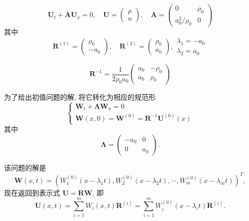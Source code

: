 \documentclass[12pt]{article}
\begin{document}
\begin{equation}
	\boldsymbol{U}_{t}+\boldsymbol{A} \boldsymbol{U}_{x}=0, \quad \boldsymbol{U}=\left(\begin{array}{l}
		\rho \\
		u
		\end{array}\right), \quad \boldsymbol{A}=\left(\begin{array}{cc}
		0 & \rho_{0} \\
		a_{0}^{2} / \rho_{0} & 0
		\end{array}\right)
\end{equation}
其中
\begin{equation}
	\boldsymbol{R}^{(1)}=\left(\begin{array}{c}
		\rho_{0} \\
		-a_{0}
		\end{array}\right), \quad \boldsymbol{R}^{(2)}=\left(\begin{array}{c}
		\rho_{0} \\
		a_{0}
		\end{array}\right), \begin{array}{l}
		\lambda_{1}=-a_{0} \\
		\lambda_{2}=a_{0}
		\end{array}
\end{equation}

\begin{equation}
	\bm{R}^{-1} = \frac{1}{2\rho_0 a_0} \begin{pmatrix}
		a_0&-\rho_0\\
		a_0&\rho_0
	\end{pmatrix}
\end{equation}

为了给出初值问题的解, 将它转化为相应的规范形
\begin{equation}
	\left\{\begin{array}{l}
		\boldsymbol{W}_{t}+\boldsymbol{\Lambda} \boldsymbol{W}_{x}=0 \\
		\boldsymbol{W}(x, 0)=\boldsymbol{W}^{(0)}=\boldsymbol{R}^{-1} \boldsymbol{U}^{(0)}(x)
		\end{array}\right.
\end{equation}
其中
\begin{equation}
	\boldsymbol{\Lambda} = \begin{pmatrix}
		-a_0 &0\\
		0&a_0
	\end{pmatrix}.
\end{equation}

该问题的解是
\begin{equation}
	\boldsymbol{W}(x, t)=\left(W_{1}^{(0)}\left(x-\lambda_{1} t\right), W_{2}^{(0)}\left(x-\lambda_{2} t\right), \cdots, W_{m}^{(0)}\left(x-\lambda_{m} t\right)\right)^{T},
\end{equation}
现在返回到表示式 $\boldsymbol{U}=\boldsymbol{R} \boldsymbol{W}$, 即
\begin{equation}
	\boldsymbol{U}(x, t)=\sum_{i=1}^{m} W_{i}(x, t) \boldsymbol{R}^{(i)}=\sum_{i=1}^{m} W_{i}^{(0)}\left(x-\lambda_{i} t\right) \boldsymbol{R}^{(i)}.
\end{equation}
\end{document}
